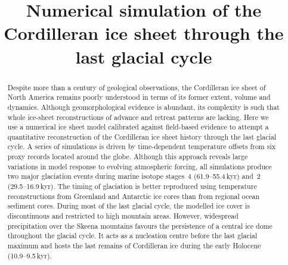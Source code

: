 \documentclass[tc, manuscript]{copernicus}
\begin{document}
\linenumbers

\title{Numerical simulation of the Cordilleran ice sheet
       through the last glacial cycle}




\received{}
\pubdiscuss{}
\revised{}
\accepted{}
\published{}

\maketitle

\begin{abstract}

  Despite more than a century of geological observations, the Cordilleran ice
  sheet of North America remains poorly understood in terms of its former
  extent, volume and dynamics. Although geomorphological evidence is abundant,
  its complexity is such that whole ice-sheet reconstructions of advance and
  retreat patterns are lacking. Here we use a numerical ice sheet model
  calibrated against field-based evidence to attempt a quantitative
  reconstruction of the Cordilleran ice sheet history through the last glacial
  cycle. A series of simulations is driven by time-dependent temperature
  offsets from six proxy records located around the globe. Although this
  approach reveals large variations in model response to evolving atmospheric
  forcing, all simulations produce two major glaciation events during
  marine isotope stages~4 (61.9--55.4\,kyr) and~2
  (29.5--16.9\,kyr). The timing of glaciation is
  better reproduced using temperature reconstructions from Greenland and
  Antarctic ice cores than from regional ocean sediment cores. During most of
  the last glacial cycle, the modelled ice cover is discontinuous and
  restricted to high mountain areas. However, widespread precipitation over the
  Skeena mountains favours the persistence of a central ice dome throughout the
  glacial cycle. It acts as a nucleation centre before the last glacial maximum
  and hosts the last remains of Cordilleran ice during the
  early Holocene (10.9--9.5\,kyr).

\end{abstract}
\end{document}
